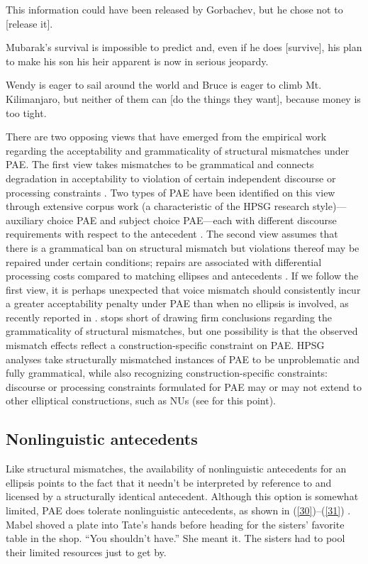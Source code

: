 \documentclass[output=paper
	        ,collection
	        ,collectionchapter
 	        ,biblatex
                ,babelshorthands
                ,newtxmath
                ,draftmode
                ,colorlinks, citecolor=brown
]{langscibook}
\begin{document}
{\eal

\ex This information could have been released by Gorbachev, but he chose not to [release it]. \citep[37]{Hardt1993} \label{27}

\ex Mubarak's survival is impossible to predict and, even if he does [survive], his plan to make his son his heir apparent is now in serious jeopardy. \citep{Miller2014a} \label{28}

\ex Wendy is eager to sail around the world and Bruce is eager to climb Mt. Kilimanjaro, but neither of them can [do the things they want], because money is too tight. \citep{Webber79a} \label{29}
\zl

There are two opposing views that have emerged from the empirical work regarding the acceptability and grammaticality of structural mismatches under PAE. The first view takes mismatches to be grammatical and connects degradation in acceptability to violation of certain independent discourse \citep{Kehler2002, Miller2011, %
Miller2014a, Miller2014b} or processing constraints \citep{Kim2011}. Two types of PAE have been identified on this view through extensive corpus work (a characteristic of the HPSG research style)---auxiliary choice PAE and subject choice PAE---each with different discourse requirements with respect to the antecedent \citep{Miller2011, Miller2014a, Miller2014b}. The second view assumes that there is a grammatical ban on structural mismatch but violations thereof may be repaired under certain conditions; repairs are associated with differential processing costs compared to matching ellipses and antecedents \citep{Arregui2006, Grant2012}. If we follow the first view, it is perhaps unexpected that voice mismatch should consistently incur a greater acceptability penalty under PAE than when no ellipsis is involved, as recently reported in \citet{Kim2011}. \citet{Kim2011} stops short of drawing firm conclusions regarding the grammaticality of structural mismatches, but one possibility is that the observed mismatch effects reflect a construction-specific constraint on PAE. HPSG analyses take structurally mismatched instances of PAE to be unproblematic and fully grammatical, while also recognizing construction-specific constraints: discourse or processing constraints formulated for PAE may or may not extend to other elliptical constructions, such as NUs (see \citealt{Ginzburg2018} for this point).


\subsection{Nonlinguistic antecedents}
Like structural mismatches, the availability of nonlinguistic antecedents for an ellipsis points to the fact that it needn't be interpreted by reference to and licensed by a structurally identical antecedent. Although this option is somewhat limited, PAE does tolerate nonlinguistic antecedents, as shown in (\ref{30})--(\ref{31}) \citep[see also][]{Hankamer1976, Schachter1977}.
\ea Mabel shoved a plate into Tate's hands before heading for the sisters' favorite table in the shop. ``You shouldn't have.'' She meant it. The sisters had to pool their limited resources
just to get by. \citep[ex. 23][]{Miller2014b}\label{30}\z

}
\end{document}
